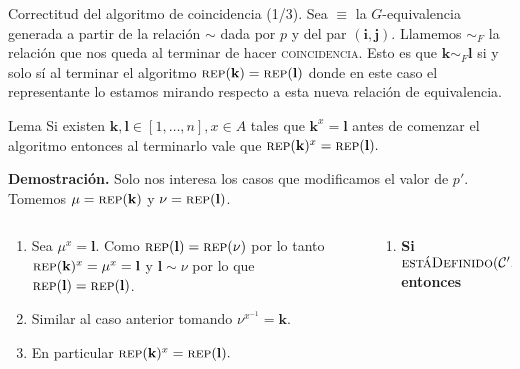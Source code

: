 \documentclass[aspectratio=169, 9pt]{beamer}
\newcommand{\rep}{\textsc{rep}}
\newcommand{\coin}{\textsc{coincidencia}}
\newcommand{\edeff}{\textsc{estáDefinido}}
\newcommand{\In}{[1 \dots n]}
\newcommand{\Co}{{\cal{C}}}
\begin{document}
\begin{frame}[fragile]{Correctitud del algoritmo de coincidencia (1/3).}
	Sea $\equiv$ la $G$-equivalencia generada a partir de la relación $\sim$ dada por $p$ y del par $(\textbf{i}, \textbf{j})$.
	\pause
	Llamemos $\sim_F$ la relación que nos queda al terminar de hacer \coin.
	Esto es que $\textbf{k} \sim_F \textbf{l}$ si y solo sí al terminar el algoritmo $\rep (\textbf{k}) = \rep(\textbf{l})$ donde en este caso el representante lo estamos mirando respecto a esta nueva relación de equivalencia.
	\pause
	
	\begin{alertblock}{Lema}
		Si existen $\textbf{k}, \textbf{l} \in [1,\dots,n], x \in A$ tales que $\textbf{k}^x = \textbf{l}$ antes de comenzar el algoritmo entonces al terminarlo vale que $\rep(\textbf{k})^x = \rep(\textbf{l}).$
	\end{alertblock}
	\pause
	\textbf{Demostración.} 
	\pause
	Solo nos interesa los casos que modificamos el valor de $p'$. 
	Tomemos $\mu = \rep(\textbf{k}) $ y $\nu = \rep(\textbf{l})$.
	\pause
	\begin{columns}
		\begin{column}{0.5\textwidth}
			\begin{enumerate}
				\item Sea $\mu^x = \textbf{l}$. 
				Como $\rep (\textbf{l}) = \rep (\nu)$ por lo tanto $\rep(\textbf{k})^x = \mu^x = \textbf{l} $ y $\textbf{l} \sim \nu $ por lo que $ \rep(\textbf{l}) = \rep (\textbf{l})$.
				\item Similar al caso anterior tomando $\nu^{x^{-1}} = \textbf{k}$.
				\item En particular $\rep(\textbf{k})^x = \rep(\textbf{l}).$
			\end{enumerate}
		\end{column}
		\begin{column}{0.5\textwidth}  %
			\begin{enumerate}
				\item  \textbf{Si} $\edeff(\Co', \mu, x)$ \textbf{entonces}
				

\end{enumerate}
\end{column}
\end{columns}
\end{frame}
\end{document}
